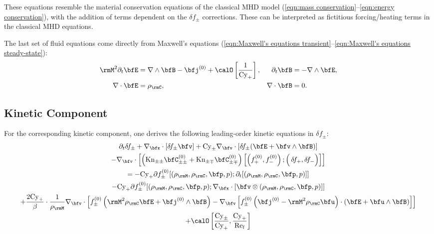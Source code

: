         These equations resemble the material conservation equations of the classical MHD model (\ref{eqn:mass conservation}--\ref{eqn:energy conservation}), with the addition of terms dependent on the $\delta\!f_{\pm}$ corrections. These can be interpreted as fictitious forcing/heating terms in the classical MHD equations.

        \shortline

        The last set of fluid equations come directly from Maxwell's equations (\ref{eqn:Maxwell's equations transient}--\ref{eqn:Maxwell's equations steady-state}):
        \begin{align}
            \rmM^{2}\partial_{t}\bfE  &=  \nabla\wedge\bfB - \bfj^{(0)} + \calO\left[\frac{1}{\rmCy_{+}}\right],  &
            \partial_{t}\bfB          &=  - \nabla\wedge\bfE,  \label{eqn:PiC-coupled Maxwell's equations transient}  \\
            \nabla\cdot\bfE           &=  \rho_{\rmC},  &
            \nabla\cdot\bfB           &=  0.  \label{eqn:PiC-coupled Maxwell's equations steady-state}
        \end{align}

    \subsection*{Kinetic Component}
        For the corresponding kinetic component, one derives the following leading-order kinetic equations in $\delta\!f_{\pm}$:
        \begin{multline}\label{eqn:linearized Boltzmann equation}
            \partial_{t}\delta\!f_{\pm} + \nabla_{\bfx}\cdot[\delta\!f_{\pm}\bfv] + \rmCy_{\pm}\nabla_{\bfv}\cdot[\delta\!f_{\pm}(\bfE + \bfv\wedge\bfB)]  \\
            - \nabla_{\bfv}\cdot\left[\left(\rmKn_{\pm\pm}\bfC_{\pm\pm}^{(0)} + \rmKn_{\pm\mp}\bfC_{\pm\mp}^{(0)}\right)\left[\left(f_{+}^{(0)}, f_{-}^{(0)}\right); \left({\color{white} f_{+}^{(0)}}\!\!\!\!\!\!\!\!\!\delta\!f_{+}, \delta\!f_{-}\right)\right]\right]  \\
            =  - \rmCy_{+}\partial f_{\pm}^{(0)}[(\rho_{\rmM}, \rho_{\rmC}, \bfp, p); \partial_{t}[(\rho_{\rmM}, \rho_{\rmC}, \bfp, p)]]  \\
            - \rmCy_{+}\partial f_{\pm}^{(0)}[(\rho_{\rmM}, \rho_{\rmC}, \bfp, p); \nabla_{\bfx}\cdot[\bfv\otimes(\rho_{\rmM}, \rho_{\rmC}, \bfp, p)]]  \\
            + \frac{2\rmCy_{+}}{\beta}\cdot\frac{1}{\rho_{\rmM}}\nabla_{\bfv}\cdot\left[f_{\pm}^{(0)}\left(\rmM^{2}\rho_{\rmC}\bfE + \bfj^{(0)}\wedge\bfB\right) - \nabla_{\bfv}\left[f_{\pm}^{(0)}\left(\bfj^{(0)} - \rmM^{2}\rho_{\rmC}\bfu\right)\cdot\left(\bfE + \bfu\wedge\bfB\right)\right]\right]  \\
            + \calO\left[\frac{\rmCy_{\pm}}{\rmCy_{+}}, \frac{\rmCy_{+}}{\rmRef}\right]
        \end{multline}
        
